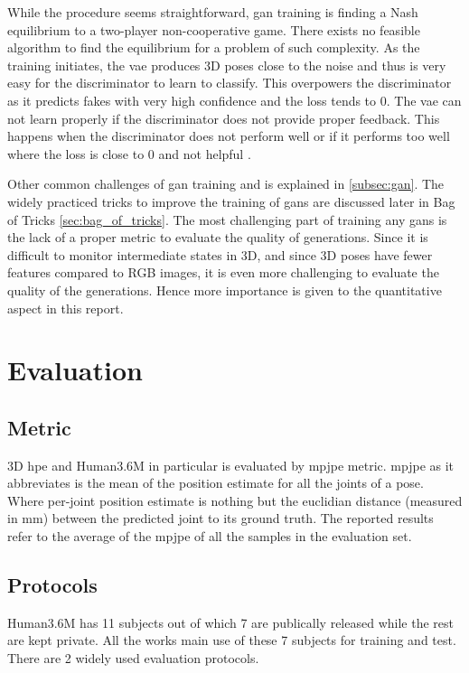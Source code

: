While the procedure seems straightforward, \ac{gan} training is finding a Nash equilibrium to a two-player non-cooperative game. There exists no feasible algorithm to find the equilibrium for a problem of such complexity\cite{improved_gan}. As the training initiates, the \ac{vae} produces 3D poses close to the noise and thus is very easy for the discriminator to learn to classify. This overpowers the discriminator as it predicts fakes with very high confidence and the loss tends to 0. The \ac{vae} can not learn properly if the discriminator does not provide proper feedback. This happens when the discriminator does not perform well or if it performs too well where the loss is close to 0 and not helpful \cite{gan_wgan_tutorial}. 

Other common challenges of \ac{gan} training and is explained in \ref{subsec:gan}. The widely practiced tricks to improve the training of \acp{gan} are discussed later in Bag of Tricks \ref{sec:bag_of_tricks}. The most challenging part of training any \acp{gan} is the lack of a proper metric to evaluate the quality of generations. Since it is difficult to monitor intermediate states in 3D, and since 3D poses have fewer features compared to RGB images, it is even more challenging to evaluate the quality of the generations. Hence more importance is given to the quantitative aspect in this report.



\section{Evaluation} 

\subsection{Metric}
3D \ac{hpe} and Human3.6M in particular is evaluated by \ac{mpjpe} metric. \ac{mpjpe} as it abbreviates is the mean of the position estimate for all the joints of a pose. Where per-joint position estimate is nothing but the euclidian distance (measured in mm) between the predicted joint to its ground truth. The reported results refer to the average of the \ac{mpjpe} of all the samples in the evaluation set. 

\subsection{Protocols}
Human3.6M has 11 subjects out of which 7 are publically released while the rest are kept private. All the works main use of these 7 subjects for training and test. There are 2 widely used evaluation protocols. 


